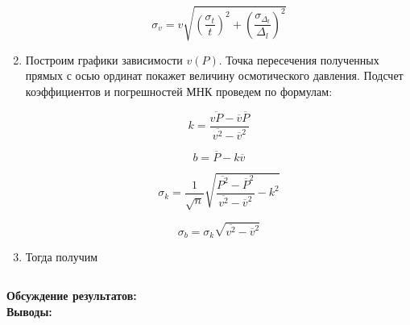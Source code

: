 \documentclass[a4paper, 12pt]{article}%
\begin{document}
\begin{enumerate}
	
	$$ \sigma_v = v \sqrt{(\frac{\sigma_t}{t})^2 + (\frac{\sigma_{\Delta_l}}{\Delta_l})^2 } $$
	
	
	\item Построим графики зависимости $ v(P) $. Точка пересечения полученных прямых с осью ординат покажет величину осмотического давления. Подсчет коэффициентов и погрешностей МНК проведем по формулам: 
	
	$$ k = \frac{\overline{vP} - \overline v  \overline P}{\overline{v^2} - \overline v ^2} $$
	
	$$ b = \overline P - k \overline v $$
	
	$$ \sigma_k = \frac{1}{\sqrt n} \sqrt{\frac{\overline{P^2} - \overline P ^2}{\overline{v^2} - \overline v ^2} - k^2} $$
	
	
	$$ \sigma_b = \sigma_k \sqrt{\overline{v^2} - \overline v ^2} $$
	
	
	\item Тогда получим 
	
	\begin{longtable}{|c|c|c|c|}
		\hline
		
	\end{longtable}
\end{enumerate}
	\textbf{Обсуждение результатов: }\\
		
		
	\textbf{Выводы: }\\
	
\end{document}
